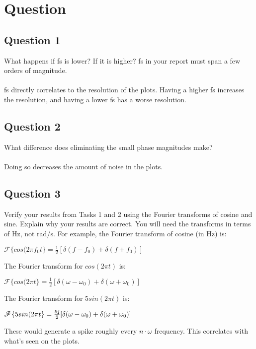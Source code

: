 \documentclass[12pt,a4paper]{article}
\begin{document}
\section{Question}
\subsection{Question 1}
What happens if fs is lower? If it is higher? fs in your report must span a few orders of magnitude.\\
\\
fs directly correlates to the resolution of the plots. Having a higher fs increases the resolution, and having a lower fs has a worse resolution. 
\subsection{Question 2}
What difference does eliminating the small phase magnitudes make?\\
\\
Doing so decreases the amount of noise in the plots. 
\subsection{Question 3}
Verify your results from Tasks 1 and 2 using the Fourier transforms of cosine and sine. Explain why your results are correct. You will need the transforms in terms of Hz, not rad/s. For example, the Fourier transform of cosine (in Hz) is:\\
\begin{center}
    $\mathscr{F}\{cos(2\pi f_0 t\}=\frac{1}{2}[\delta(f-f_0)+\delta(f+f_0)]$\\
\end{center}
The Fourier transform for $cos(2\pi t)$ is:
\begin{center}
    $\mathscr{F}\{cos(2\pi t\}=\frac{1}{2}[\delta(\omega-\omega_0)+\delta(\omega+\omega_0)]$\\
\end{center}
The Fourier transform for $5sin(2\pi t)$ is:
\begin{center}
    $\mathscr{F}\{5sin(2\pi t\}=\frac{5\textbf{\textit{j}}}{2}[\delta(\omega-\omega_0)+\delta(\omega+\omega_0)]$\\
\end{center}
These would generate a spike roughly every $n\cdot \omega$ frequency. This correlates with what's seen on the plots.
\end{document}
